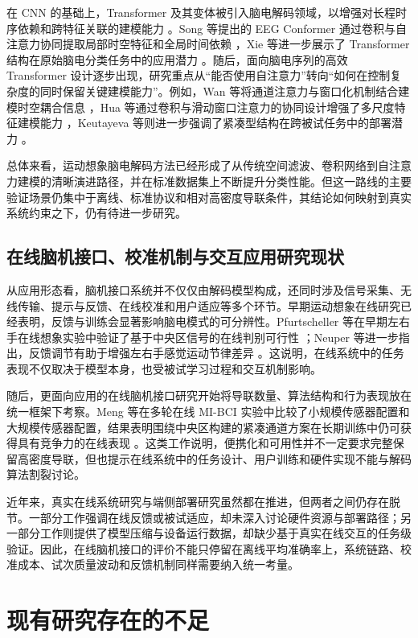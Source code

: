 在 CNN 的基础上，Transformer 及其变体被引入脑电解码领域，以增强对长程时序依赖和跨特征关联的建模能力 \cite{vaswani2017attention}。Song 等提出的 EEG Conformer 通过卷积与自注意力协同提取局部时空特征和全局时间依赖 \cite{songEEG2022}，Xie 等进一步展示了 Transformer 结构在原始脑电分类任务中的应用潜力 \cite{xie_transformer-based_2022}。随后，面向脑电序列的高效 Transformer 设计逐步出现，研究重点从“能否使用自注意力”转向“如何在控制复杂度的同时保留关键建模能力”。例如，Wan 等将通道注意力与窗口化机制结合建模时空耦合信息 \cite{wan2023novel}，Hua 等通过卷积与滑动窗口注意力的协同设计增强了多尺度特征建模能力 \cite{hua2023improved}，Keutayeva 等则进一步强调了紧凑型结构在跨被试任务中的部署潜力 \cite{keu2024compact}。

总体来看，运动想象脑电解码方法已经形成了从传统空间滤波、卷积网络到自注意力建模的清晰演进路径，并在标准数据集上不断提升分类性能。但这一路线的主要验证场景仍集中于离线、标准协议和相对高密度导联条件，其结论如何映射到真实系统约束之下，仍有待进一步研究。

\subsection{在线脑机接口、校准机制与交互应用研究现状}

从应用形态看，脑机接口系统并不仅仅由解码模型构成，还同时涉及信号采集、无线传输、提示与反馈、在线校准和用户适应等多个环节。早期运动想象在线研究已经表明，反馈与训练会显著影响脑电模式的可分辨性。Pfurtscheller 等在早期左右手在线想象实验中验证了基于中央区信号的在线判别可行性 \cite{Pfu97}；Neuper 等进一步指出，反馈调节有助于增强左右手感觉运动节律差异 \cite{Neu99}。这说明，在线系统中的任务表现不仅取决于模型本身，也受被试学习过程和交互机制影响。

随后，更面向应用的在线脑机接口研究开始将导联数量、算法结构和行为表现放在统一框架下考察。Meng 等在多轮在线 MI-BCI 实验中比较了小规模传感器配置和大规模传感器配置，结果表明围绕中央区构建的紧凑通道方案在长期训练中仍可获得具有竞争力的在线表现 \cite{Men18}。这类工作说明，便携化和可用性并不一定要求完整保留高密度导联，但也提示在线系统中的任务设计、用户训练和硬件实现不能与解码算法割裂讨论。

近年来，真实在线系统研究与端侧部署研究虽然都在推进，但两者之间仍存在脱节。一部分工作强调在线反馈或被试适应，却未深入讨论硬件资源与部署路径；另一部分工作则提供了模型压缩与设备运行数据，却缺少基于真实在线交互的任务级验证。因此，在线脑机接口的评价不能只停留在离线平均准确率上，系统链路、校准成本、试次质量波动和反馈机制同样需要纳入统一考量。

\section{现有研究存在的不足}

